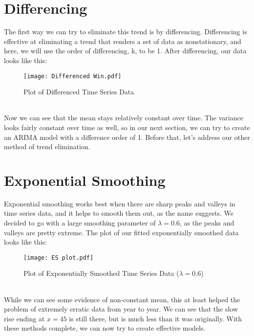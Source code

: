 \documentclass[12pt]{article}
\begin{document}
\section{Differencing}\label{sec:chapter}
The first way we can try to eliminate this trend is by differencing. Differencing is effective at eliminating a trend that renders a set of data as nonstationary, and here, we will use the order of differencing, k, to be 1. After differencing, our data looks like this:\\
\begin{figure}[h!]
\centering
\texttt{[image: Differenced Win.pdf]}
\caption{Plot of Differenced Time Series Data}
\label{fig:Figure 2}
\end{figure}\\
Now we can see that the mean stays relatively constant over time. The variance looks fairly constant over time as well, so in our next section, we can try to create an ARIMA model with a difference order of 1. Before that, let's address our other method of trend elimination.\\

\section{Exponential Smoothing}\label{sec:chapter}
Exponential smoothing works best when there are sharp peaks and valleys in time series data, and it helps to smooth them out, as the name suggests. We decided to go with a large smoothing parameter of \(\lambda = 0.6\), as the peaks and valleys are pretty extreme. The plot of our fitted exponentially smoothed data looks like this:\\
\begin{figure}[h!]
\centering
\texttt{[image: ES plot.pdf]}
\caption{Plot of Exponentially Smoothed Time Series Data (\(\lambda = 0.6\))}
\label{fig:Figure 3}
\end{figure}\\
While we can see some evidence of non-constant mean, this at least helped the problem of extremely erratic data from year to year. We can see that the slow rise ending at \(x = 45\) is still there, but is much less than it was originally. With these methods complete, we can now try to create effective models.\\
\end{document}
